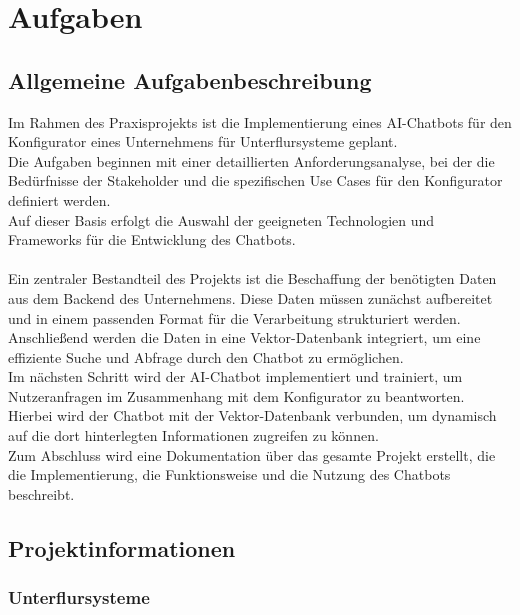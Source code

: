 \chapter{Aufgaben}\label{ch:aufgaben}
\section{Allgemeine Aufgabenbeschreibung}\label{sec:aufgaben_allgemein}

Im Rahmen des Praxisprojekts ist die Implementierung eines AI-Chatbots für den
Konfigurator eines Unternehmens für Unterflursysteme geplant.\\ 
Die Aufgaben beginnen mit einer detaillierten Anforderungsanalyse, bei der die Bedürfnisse der
Stakeholder und die spezifischen Use Cases für den Konfigurator definiert werden.\\
Auf dieser Basis erfolgt die Auswahl der geeigneten Technologien und Frameworks
für die Entwicklung des Chatbots.\\\\ Ein zentraler Bestandteil des Projekts ist die
Beschaffung der benötigten Daten aus dem Backend des Unternehmens. Diese
Daten müssen zunächst aufbereitet und in einem passenden Format für die
Verarbeitung strukturiert werden.\\
Anschließend werden die Daten in eine Vektor-Datenbank integriert, um eine
effiziente Suche und Abfrage durch den Chatbot zu ermöglichen.\\Im nächsten
Schritt wird der AI-Chatbot implementiert und trainiert, um Nutzeranfragen im
Zusammenhang mit dem Konfigurator zu beantworten.
Hierbei wird der Chatbot mit der Vektor-Datenbank verbunden, um dynamisch auf
die dort hinterlegten Informationen zugreifen zu können.\\
Zum Abschluss wird eine Dokumentation über das gesamte Projekt erstellt, die die
Implementierung, die Funktionsweise und die Nutzung des Chatbots beschreibt.


\pagebreak
\section{Projektinformationen}\label{sec:proj_info}
\subsection{Unterflursysteme}\label{sec:unterflursysteme}

